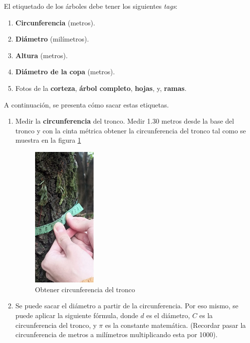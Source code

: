 \documentclass{article}
\begin{document}
El etiquetado de los árboles debe tener los siguientes \textit{tags}:

\begin{enumerate}
  \item \textbf{Circunferencia} (metros).
  \item \textbf{Diámetro} (milímetros).
  \item \textbf{Altura} (metros).
  \item \textbf{Diámetro de la copa} (metros).
  \item Fotos de la \textbf{corteza}, \textbf{árbol completo}, \textbf{hojas}, y, \textbf{ramas}.
\end{enumerate}

A continuación, se presenta cómo sacar estas etiquetas.

\begin{enumerate}
  \item Medir la \textbf{circunferencia} del tronco. Medir 1.30 metros desde la base del tronco y con la cinta métrica obtener la circunferencia del tronco tal como se muestra en la figura \ref{fig:circunferencia}
        \begin{figure}[H]
          \centering
          \includegraphics[width=0.3\textwidth]{img/Circunferencia.jpg}
          \caption{Obtener circunferencia del tronco}
          \label{fig:circunferencia}
        \end{figure}
  \item Se puede sacar el diámetro a partir de la circunferencia. Por eso mismo, se puede aplicar la siguiente fórmula, donde \(d\) es el diámetro, \(C\) es la circunferencia del tronco, y \(\pi\) es la constante matemática. (Recordar pasar la circunferencia de metros a milímetros multiplicando esta por 1000).

\end{enumerate}
\end{document}

